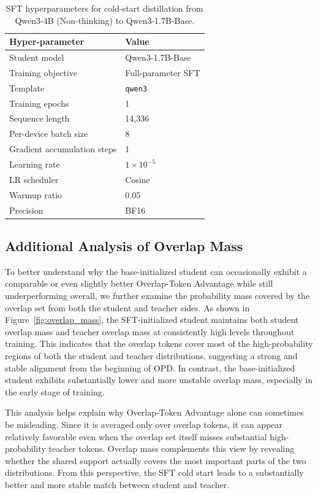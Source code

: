 \begin{table}[t]
\centering
\caption{SFT hyperparameters for cold-start distillation from Qwen3-4B (Non-thinking) to Qwen3-1.7B-Base.}
\label{tab:coldstart_sft_hparams}
\begin{tabular}{ll}
\toprule
\textbf{Hyper-parameter} & \textbf{Value} \\
\midrule
Student model & Qwen3-1.7B-Base \\
Training objective & Full-parameter SFT \\
Template & \texttt{qwen3} \\
Training epochs & 1 \\
Sequence length & 14{,}336 \\
Per-device batch size & 8 \\
Gradient accumulation steps & 1 \\
Learning rate & $1 \times 10^{-5}$ \\
LR scheduler & Cosine \\
Warmup ratio & 0.05 \\
Precision & BF16 \\
\bottomrule
\end{tabular}
\end{table}

\subsection{Additional Analysis of Overlap Mass}
\label{app:add_analysis_of_overlap_mass}

To better understand why the base-initialized student can occasionally exhibit a comparable or even slightly better Overlap-Token Advantage while still underperforming overall, we further examine the probability mass covered by the overlap set from both the student and teacher sides. As shown in Figure~\ref{fig:overlap_mass}, the SFT-initialized student maintains both student overlap mass and teacher overlap mass at consistently high levels throughout training. This indicates that the overlap tokens cover most of the high-probability regions of both the student and teacher distributions, suggesting a strong and stable alignment from the beginning of OPD. In contrast, the base-initialized student exhibits substantially lower and more unstable overlap mass, especially in the early stage of training. 

This analysis helps explain why Overlap-Token Advantage alone can sometimes be misleading. Since it is averaged only over overlap tokens, it can appear relatively favorable even when the overlap set itself misses substantial high-probability teacher tokens. Overlap mass complements this view by revealing whether the shared support actually covers the most important parts of the two distributions. From this perspective, the SFT cold start leads to a substantially better and more stable match between student and teacher.

